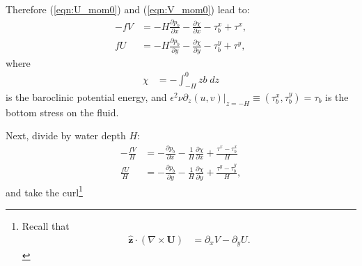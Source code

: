 \documentclass[10pt]{amsart}
\begin{document}
 Therefore (\ref{eqn:U_mom0}) and (\ref{eqn:V_mom0}) lead to:
 \begin{align}
- f V & =  - H \frac{\partial p_b}{\partial x} - \frac{\partial \chi}{\partial x}  - \tau^x_b + \tau^x , \label{eqn:U_mom} \\
f  U & = - H \frac{\partial p_b}{\partial y} - \frac{\partial \chi }{\partial y}  - \tau^y_b + \tau^y \label{eqn:V_mom} ,
\end{align}
where
\begin{align}
\chi & = - \int_{-H}^0 z b \; dz
\end{align}
is the baroclinic potential energy, and $\epsilon^2  \nu \left. \partial_z (u,v) \right|_{z = -H}  \equiv (\tau^x_b, \tau^y_b) = \tau_b$ is the bottom stress on the fluid.

Next, divide by water depth $H$:
 \begin{align}
- \frac{f V}{H} & =  - \frac{\partial p_b}{\partial x} - \frac{1}{H} \frac{\partial \chi}{\partial x} + \frac{\tau^x - \tau^x_b}{H}   \\
\frac{f  U}{H} & = - \frac{\partial p_b}{\partial y} - \frac{1}{H} \frac{\partial \chi }{\partial y} + \frac{\tau^y - \tau^y_b}{H} ,
\end{align}
and take the curl\footnote{
Recall that 
\begin{align}
{\hat{\mathbf z}} \cdot \left( \nabla \times {\mathbf U} \right) & = \partial_x V - \partial_y U .
\end{align}
}
\end{document}
